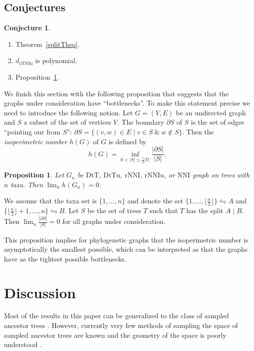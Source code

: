 \documentclass{amsart}
\newtheorem{proposition}[lemma]{Proposition}
\theoremstyle{definition}
\newtheorem{conjecture}[lemma]{Conjecture}
\newcommand{\nni}{\mathrm{NNI}}
\newcommand{\rnni}{\mathrm{rNNI}}
\newcommand{\rnniu}{\mathrm{rNNIu}}
\newcommand{\dtt}{\mathrm{DtT}}
\newcommand{\dttu}{\mathrm{DtTu}}
\begin{document}
\vskip10pt
\subsection{Conjectures}
\begin{conjecture}
\begin{enumerate}[(1)]
The list of conjectures that would be nice to settle or refute in this paper:
\item Theorem~\ref{splitTheo}.
\item $d_\rnniu$ is polynomial.
\item Proposition~\ref{isoperiPropo}.
\end{enumerate}
\end{conjecture}

We finish this section with the following proposition that suggests that the graphs under consideration have ``bottlenecks''.
To make this statement precise we need to introduce the following notion.
Let $G = (V, E)$ be an undirected graph and $S$ a subset of the set of vertices $V$.
The boundary $\partial S$ of $S$ is the set of edges ``pointing our from $S$'': $\partial S = \{(v,w) \in E \mid v \in S ~\&~ w \notin S\}$.
Then the \emph{isoperimetric number} $h(G)$ of $G$ is defined by
\[
h(G) = \inf\limits_{0 < |S| \leq \frac12|V|} \frac{|\partial S|}{|S|}.
\]

\begin{proposition}\label{isoperiPropo}
Let $G_n$ be $\dtt$, $\dttu$, $\rnni$, $\rnniu$, or $\nni$ graph on trees with $n$ taxa.
Then $\lim_n h(G_n) = 0$.
\end{proposition}

\proof
We assume that the taxa set is $\{1,\ldots,n\}$ and denote the set $\{1,\ldots,\lfloor \frac n2 \rfloor\} \leftrightharpoons A$ and $\{\lfloor \frac n2 \rfloor + 1,\ldots, n\} \leftrightharpoons B$.
Let $S$ be the set of trees $T$ such that $T$ has the split $A \mid B$.
Then $\lim_n \frac{|\partial S|}{|S|} = 0$ for all graphs under consideration.
\endproof

This proposition implies for phylogenetic graphs that the isoperimetric number is asymptotically the smallest possible, which can be interpreted as that the graphs have as the tightest possible bottlenecks.


\section{Discussion}
Most of the results in this paper can be generalized to the class of sampled ancestor trees \autocite{Gavryushkina2014-xd}.
However, currently very few methods of sampling the space of sampled ancestor trees are known \autocite{Gavryushkina2015-vq} and the geometry of the space is poorly understood \autocite{Gavryushkin2014-bw}.


\printbibliography
\end{document}
